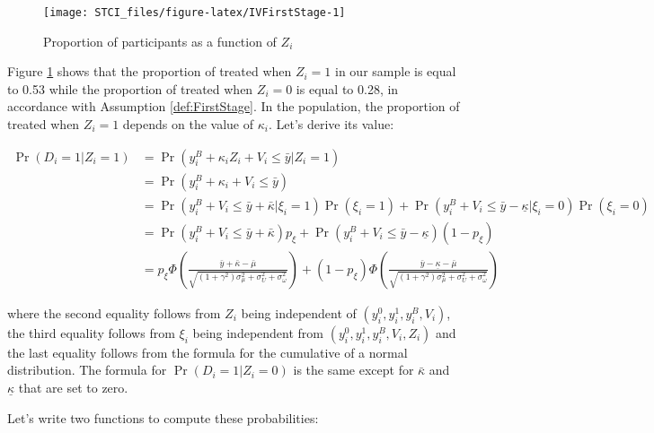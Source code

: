 \documentclass[
]{book}
\theoremstyle{definition}
\theoremstyle{definition}
\theoremstyle{definition}
\theoremstyle{definition}
\theoremstyle{remark}
\begin{document}
\begin{figure}[htbp]

{\centering \texttt{[image: STCI\_files/figure-latex/IVFirstStage-1]} 

}

\caption{Proportion of participants as a function of $Z_i$}\label{fig:IVFirstStage}
\end{figure}

Figure \ref{fig:IVFirstStage} shows that the proportion of treated when \(Z_i=1\) in our sample is equal to 0.53 while the proportion of treated when \(Z_i=0\) is equal to 0.28, in accordance with Assumption \ref{def:FirstStage}.
In the population, the proportion of treated when \(Z_i=1\) depends on the value of \(\kappa_i\).
Let's derive its value:

\begin{align*}
  \Pr(D_i=1|Z_i=1) & = \Pr(y_i^B+\kappa_i Z_i + V_i\leq\bar{y}|Z_i=1) \\
                  & =  \Pr(y_i^B+\kappa_i + V_i\leq\bar{y}) \\
                  & =  \Pr(y_i^B+ V_i\leq\bar{y}+\bar{\kappa}|\xi_i=1)\Pr(\xi_i=1) + \Pr(y_i^B+V_i\leq\bar{y}-\underline{\kappa}|\xi_i=0)\Pr(\xi_i=0) \\
                                    & =  \Pr(y_i^B+ V_i\leq\bar{y}+\bar{\kappa})p_{\xi} + \Pr(y_i^B+ V_i\leq\bar{y}-\underline{\kappa})(1-p_{\xi}) \\
                  & =  p_{\xi}\Phi\left(\frac{\bar{y}+\bar{\kappa}-\bar{\mu}}{\sqrt{(1+\gamma^2)\sigma^2_{\mu}+\sigma^2_{U}+\sigma^2_{\omega}}}\right) + (1-p_{\xi})\Phi\left(\frac{\bar{y}-\underline{\kappa}-\bar{\mu}}{\sqrt{(1+\gamma^2)\sigma^2_{\mu}+\sigma^2_{U}+\sigma^2_{\omega}}}\right)
\end{align*}

where the second equality follows from \(Z_i\) being independent of \((y_i^0,y_i^1,y_i^B,V_i)\), the third equality follows from \(\xi_i\) being independent from \((y_i^0,y_i^1,y_i^B,V_i,Z_i)\) and the last equality follows from the formula for the cumulative of a normal distribution.
The formula for \(\Pr(D_i=1|Z_i=0)\) is the same except for \(\bar{\kappa}\) and \(\underline{\kappa}\) that are set to zero.

Let's write two functions to compute these probabilities:
\end{document}
